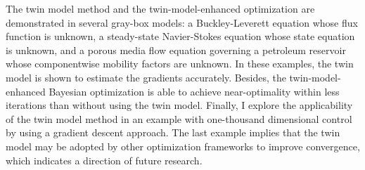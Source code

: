 The twin model method and the twin-model-enhanced optimization are 
demonstrated in several gray-box models:
a Buckley-Leverett equation whose flux function
is unknown,
a steady-state Navier-Stokes equation whose state equation is unknown, 
and a porous media flow equation governing a petroleum reservoir whose componentwise
mobility factors are unknown. In these examples, the twin model is shown to
estimate the gradients accurately. 
Besides, the twin-model-enhanced Bayesian optimization is able to
achieve near-optimality within less iterations than without using the twin model.
Finally, I explore the applicability of the twin model method in
an example with one-thousand dimensional control by using a gradient descent approach.
The last example implies that the twin model may be adopted by
other optimization frameworks to improve convergence, which indicates a direction of future research.
